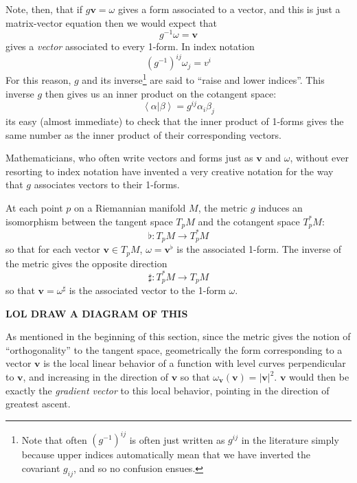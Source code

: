 	Note, then, that if $g \mathbf v = \omega$ gives a form associated to a vector, and this is just a matrix-vector equation then we would expect that 
	\begin{equation}
		g^{-1} \omega = \mathbf v
	\end{equation}
	gives a \emph{vector} associated to every 1-form. In index notation
	\begin{equation}
		(g^{-1})^{ij} \omega_j = v^i
	\end{equation}
	For this reason, $g$ and its inverse\footnote{Note that often $(g^{-1})^{ij}$ is often just written as $g^{ij}$ in the literature simply because upper indices automatically mean that we have inverted the covariant $g_{ij}$, and so no confusion ensues.} are said to ``raise and lower indices''. This inverse $g$ then gives us an inner product on the cotangent space:
	\begin{equation}
		\left< \alpha | \beta \right> = g^{ij} \alpha_i \beta_j
	\end{equation} 
	its easy (almost immediate) to check that the inner product of 1-forms gives the same number as the inner product of their corresponding vectors.
	
	Mathematicians, who often write vectors and forms just as $\mathbf v$ and $\omega$, without ever resorting to index notation have invented a very creative notation for the way that $g$ associates vectors to their 1-forms.
	\begin{prop}
		At each point $p$ on a Riemannian manifold $M$, the metric $g$ induces an isomorphism between the tangent space $T_pM$ and the cotangent space $T^*_pM$:
		\begin{equation}
			\flat: T_pM \rightarrow T^*_pM
		\end{equation}
		so that for each vector $\mathbf v \in T_pM$, $\omega = \mathbf v^\flat$ is the associated 1-form. The inverse of the metric gives the opposite direction
		\begin{equation}
			\sharp: T^*_pM \rightarrow T_pM
		\end{equation}
		so that $\mathbf v = \omega^\sharp$ is the associated vector to the 1-form $\omega$.
	\end{prop}
	\textbf{LOL DRAW A DIAGRAM OF THIS}

	As mentioned in the beginning of this section, since the metric gives the notion of ``orthogonality'' to the tangent space, geometrically the form corresponding to a vector $\mathbf v$ is the local linear behavior of a function with level curves perpendicular to $\mathbf v$, and increasing in the direction of $\mathbf v$ so that $\omega_{\mathbf v}(\mathbf v) = |\mathbf v|^2$. $\mathbf v$ would then be exactly the \emph{gradient vector} to this local behavior, pointing in the direction of greatest ascent. 
	
